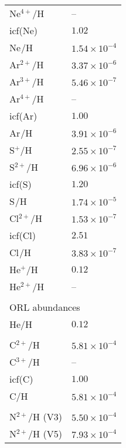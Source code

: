 \begin{longtable}[l]{ll}
 Ne$^{4+}$/H                         & -- \\
 icf(Ne)                             & $  1.02$\\
 Ne$^{}$/H                           & $  1.54\times 10^{ -4}$\\
 Ar$^{2+}$/H                         & $  3.37\times 10^{ -6}$\\
 Ar$^{3+}$/H                         & $  5.46\times 10^{ -7}$\\
 Ar$^{4+}$/H                         & -- \\
 icf(Ar)                             & $  1.00$\\
 Ar$^{}$/H                           & $  3.91\times 10^{ -6}$\\
 S$^{+}$/H                           & $  2.55\times 10^{ -7}$\\
 S$^{2+}$/H                          & $  6.96\times 10^{ -6}$\\
 icf(S)                              & $  1.20$\\
 S$^{}$/H                            & $  1.74\times 10^{ -5}$\\
 Cl$^{2+}$/H                         & $  1.53\times 10^{ -7}$\\
 icf(Cl)                             & $  2.51$\\
 Cl$^{}$/H                           & $  3.83\times 10^{ -7}$\\
 He$^{+}$/H                          & $  0.12$\\
 He$^{2+}$/H                         & -- \\
 \vspace{0.2cm}\\\multicolumn{2}{l}{ORL abundances}\\ \hline
 He/H                                & $  0.12$\\
 \\
 C$^{2+}$/H                          & $  5.81\times 10^{ -4}$\\
 C$^{3+}$/H                          & -- \\
 icf(C)                              & $  1.00$\\
 C/H                                 & $  5.81\times 10^{ -4}$\\
 \\
 N$^{2+}$/H (V3)                     & $  5.50\times 10^{ -4}$\\
 N$^{2+}$/H (V5)                     & $  7.93\times 10^{ -4}$\\

\end{longtable}
